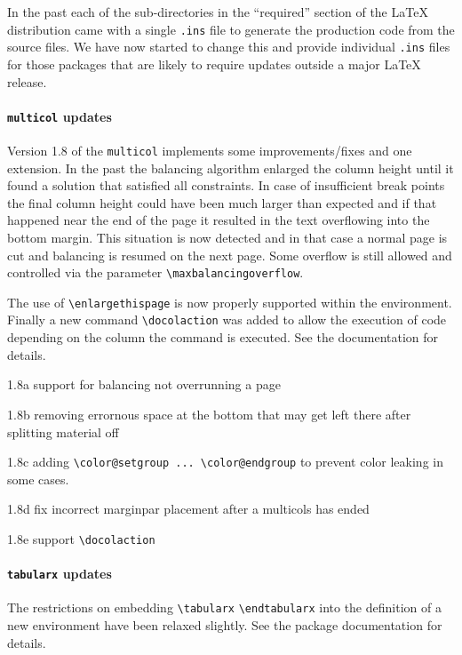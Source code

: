 \documentclass{ltnews}
\begin{document}
In the past each of the sub-directories in the ``required'' section of
the \LaTeX{} distribution came with a single \texttt{.ins} file to
generate the production code from the source files. We have now
started to change this and provide individual \texttt{.ins} files for
those packages that are likely to require updates outside a major
\LaTeX{} release.

\paragraph{\texttt{multicol} updates}

Version 1.8 of the \texttt{multicol} implements some
improvements/fixes and one extension. In the past the balancing
algorithm enlarged the column height until it found a solution that
satisfied all constraints. In case of insufficient break points the
final column height could have been much larger than expected and if
that happened near the end of the page it resulted in the text
overflowing into the bottom margin. This situation is now detected and
in that case a normal page is cut and balancing is resumed on the next
page. Some overflow is still allowed and controlled via the parameter
\verb=\maxbalancingoverflow=.

The use of \verb=\enlargethispage= is now properly supported
within the environment. Finally a new command \verb=\docolaction= was
added to allow the execution of code depending on the column the
command is executed. See the documentation for details.





1.8a support for balancing not overrunning a page

1.8b
removing errornous space at the bottom that may get left there after
splitting material off

1.8c
adding \verb|\color@setgroup ... \color@endgroup| to prevent color leaking in
some cases.

1.8d fix incorrect marginpar placement after a multicols has ended

1.8e support \verb=\docolaction=


\paragraph{\texttt{tabularx} updates}
The restrictions on embedding \verb|\tabularx| \verb|\endtabularx| into the definition of a new
environment have been relaxed slightly. See the package documentation for details.
\end{document}
